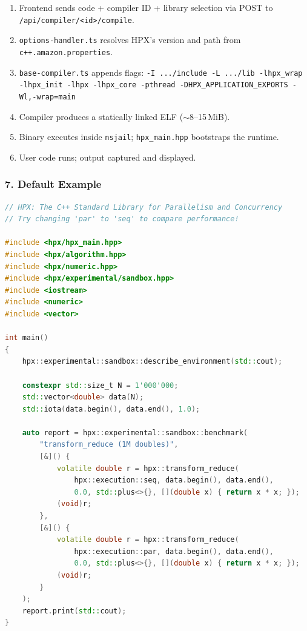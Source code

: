 \documentclass[11pt, a4paper]{article}
\newcommand{\code}[1]{\texttt{#1}}
\newcommand{\cefile}[1]{\texttt{#1}}
\begin{document}
\begin{enumerate}[leftmargin=2em, itemsep=1pt]
  \item Frontend sends code + compiler ID + library selection via POST
        to \code{/api/compiler/<id>/compile}.
  \item \cefile{options-handler.ts} resolves HPX's version and path from
        \code{c++.amazon.properties}.
  \item \cefile{base-compiler.ts} appends flags:
        \code{-I .../include -L .../lib -lhpx\_wrap -lhpx\_init
        -lhpx -lhpx\_core -pthread -DHPX\_APPLICATION\_EXPORTS -Wl,-wrap=main}
  \item Compiler produces a statically linked ELF ($\sim$8--15\,MiB).
  \item Binary executes inside \code{nsjail}; \code{hpx\_main.hpp}
        bootstraps the runtime.
  \item User code runs; output captured and displayed.
\end{enumerate}

\subsubsection*{7. Default Example}

\begin{lstlisting}[language=C++, caption={Default CE example for HPX}]
// HPX: The C++ Standard Library for Parallelism and Concurrency
// Try changing 'par' to 'seq' to compare performance!

#include <hpx/hpx_main.hpp>
#include <hpx/algorithm.hpp>
#include <hpx/numeric.hpp>
#include <hpx/experimental/sandbox.hpp>
#include <iostream>
#include <numeric>
#include <vector>

int main()
{
    hpx::experimental::sandbox::describe_environment(std::cout);

    constexpr std::size_t N = 1'000'000;
    std::vector<double> data(N);
    std::iota(data.begin(), data.end(), 1.0);

    auto report = hpx::experimental::sandbox::benchmark(
        "transform_reduce (1M doubles)",
        [&]() {
            volatile double r = hpx::transform_reduce(
                hpx::execution::seq, data.begin(), data.end(),
                0.0, std::plus<>{}, [](double x) { return x * x; });
            (void)r;
        },
        [&]() {
            volatile double r = hpx::transform_reduce(
                hpx::execution::par, data.begin(), data.end(),
                0.0, std::plus<>{}, [](double x) { return x * x; });
            (void)r;
        }
    );
    report.print(std::cout);
}
\end{lstlisting}
\end{document}

